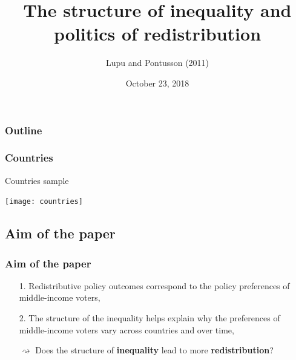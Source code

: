 \documentclass{beamer}
\title[Gerez, Riaz \& Teoldi]{The structure of inequality and politics of redistribution}
\author{Lupu and Pontusson (2011)}
\institute[] 
{
Julian Enrique Gerez, Zara Riaz \& Filippo Teoldi \\ \medskip

}
\date{October 23, 2018}
\begin{document}
\begin{frame}
\titlepage 
\end{frame}
\begin{frame}
\frametitle{Outline} 
\tableofcontents 
\end{frame}

\begin{frame}
\frametitle{Countries}
Countries sample
\begin{center}
\texttt{[image: countries]}
\end{center}
\end{frame}

\begin{frame}

\subsection{Aim of the paper}
\frametitle{Aim of the paper}
\begin{itemize}
\item [1.]  Redistributive policy outcomes correspond to the policy preferences of middle-income voters, 
\medskip
\item[2.] The structure of the inequality helps explain why the preferences of middle-income voters vary across countries and over time,
\medskip
\medskip
\medskip
\begin{center}
$\rightsquigarrow$  Does the structure of  \textbf{inequality} lead to more \textbf{redistribution}? \\
\end{center}
\medskip
\end{itemize}
\end{frame}
\end{document}
